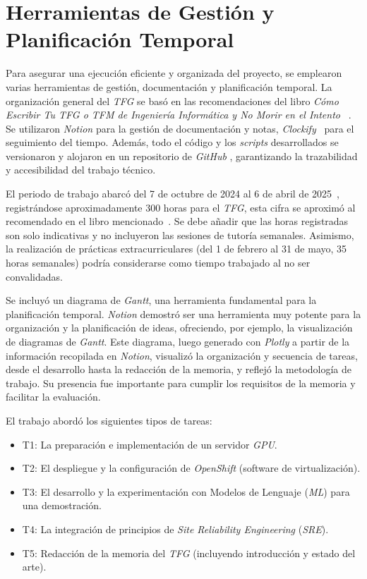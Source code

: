 \section{Herramientas de Gestión y Planificación Temporal}
Para asegurar una ejecución eficiente y organizada del proyecto, se emplearon varias herramientas de gestión, documentación y planificación temporal. La organización general del \textit{TFG} se basó en las recomendaciones del libro \textit{Cómo Escribir Tu TFG o TFM de Ingeniería Informática y No Morir en el Intento} ~\cite{ref34}. Se utilizaron \textit{Notion} para la gestión de documentación y notas, \textit{Clockify}~\cite{ref35} para el seguimiento del tiempo. Además, todo el código y los \textit{scripts} desarrollados se versionaron y alojaron en un repositorio de \textit{GitHub} \cite{ref17} , garantizando la trazabilidad y accesibilidad del trabajo técnico.

El periodo de trabajo abarcó del 7 de octubre de 2024 al 6 de abril de 2025~\cite{ref31}, registrándose aproximadamente 300 horas para el \textit{TFG}, esta cifra se aproximó al recomendado en el libro mencionado~\cite{ref34}. Se debe añadir que las horas registradas son solo indicativas y no incluyeron las sesiones de tutoría semanales. Asimismo, la realización de prácticas extracurriculares (del 1 de febrero al 31 de mayo, 35 horas semanales) podría considerarse como tiempo trabajado al no ser convalidadas.

Se incluyó un diagrama de \textit{Gantt}, una herramienta fundamental para la planificación temporal. \textit{Notion} demostró ser una herramienta muy potente para la organización y la planificación de ideas, ofreciendo, por ejemplo, la visualización de diagramas de \textit{Gantt}. Este diagrama, luego generado con \textit{Plotly} a partir de la información recopilada en \textit{Notion}, visualizó la organización y secuencia de tareas, desde el desarrollo hasta la redacción de la memoria, y reflejó la metodología de trabajo. Su presencia fue importante para cumplir los requisitos de la memoria y facilitar la evaluación.

\noindent El trabajo abordó los siguientes tipos de tareas:
\begin{itemize}
    \item T1: La preparación e implementación de un servidor \textit{GPU}.
    \item T2: El despliegue y la configuración de \textit{OpenShift} (software de virtualización).
    \item T3: El desarrollo y la experimentación con Modelos de Lenguaje (\textit{ML}) para una demostración.
    \item T4: La integración de principios de \textit{Site Reliability Engineering} (\textit{SRE}).
     \item T5: Redacción de la memoria del \textit{TFG} (incluyendo introducción y estado del arte).
\end{itemize}

